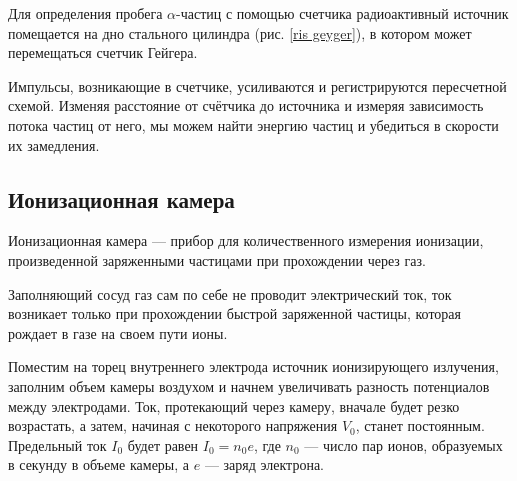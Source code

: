 \documentclass[a4paper,12pt]{article} %
\begin{document}
	Для определения пробега $\alpha$-частиц с помощью счетчика радиоактивный источник помещается на дно стального цилиндра
	(рис. \ref{ris geyger}), в котором может перемещаться счетчик Гейгера.
	
	Импульсы, возникающие в счетчике, усиливаются и регистрируются пересчетной схемой. 
	Изменяя расстояние от счётчика до источника и измеряя зависимость потока частиц от него, мы можем найти энергию частиц и 
	убедиться в скорости их замедления.
	
	\subsection{Ионизационная камера}
	
	Ионизационная камера --- прибор для количественного измерения
	ионизации, произведенной заряженными частицами при прохождении через газ.
	
	Заполняющий сосуд газ сам по себе не проводит электрический ток, 
	ток возникает только при прохождении быстрой заряженной частицы, которая рождает в газе на своем пути ионы.
	
	Поместим на торец внутреннего электрода источник
	ионизирующего излучения, заполним объем камеры воздухом и начнем
	увеличивать разность потенциалов между электродами. 
	Ток, протекающий через камеру, вначале будет резко возрастать, а затем, начиная с некоторого напряжения $ V_0 $, 
	станет постоянным.  Предельный ток $ I_0 $ будет равен $ I_0 = n_0e $,
	где $ n_0 $ --- число пар ионов, образуемых в секунду в объеме камеры, а $ e $ --- заряд электрона.
	
\end{document}
